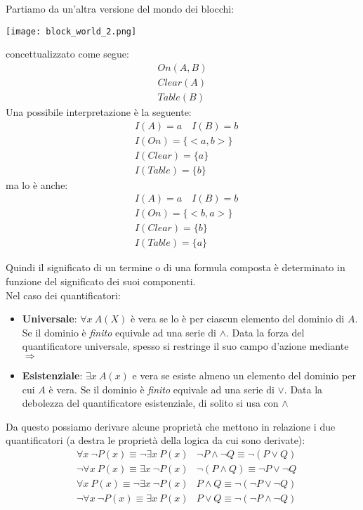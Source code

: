 \begin{example}
	Partiamo da un'altra versione del mondo dei blocchi:
	\begin{center}
		\texttt{[image: block\_world\_2.png]}
	\end{center}
	concettualizzato come segue:
	\begin{align*}
		On(A,B) \\
		Clear(A) \\
		Table(B)
	\end{align*}
	Una possibile interpretazione è la seguente:
	\begin{align*}
		&I(A)=a \quad I(B)=b \\
		&I(On)=\{<a,b>\}\\
		&I(Clear)=\{a\}\\
		&I(Table)=\{b\}
	\end{align*}
	ma lo è anche:
	\begin{align*}
		&I(A)=a \quad I(B)=b \\
		&I(On)=\{<b,a>\}\\
		&I(Clear)=\{b\}\\
		&I(Table)=\{a\}
	\end{align*}
\end{example}
Quindi il significato di un termine o di una formula composta è determinato in funzione del significato dei suoi componenti.\\
Nel caso dei quantificatori:
\begin{itemize}
	\item \textbf{Universale}: $\forall x \: A(X)$ è vera se lo è per ciascun elemento del dominio di $A$. Se il dominio è \textit{finito} equivale ad una serie di $\land$. Data la forza del quantificatore universale, spesso si restringe il suo campo d'azione mediante $\Rightarrow$
	\item \textbf{Esistenziale}: $\exists x \: A(x)$ e vera se esiste almeno un elemento del dominio per cui $A$ è vera. Se il dominio è \textit{finito} equivale ad una serie di $\lor$. Data la debolezza del quantificatore esistenziale, di solito si usa con $\land$
\end{itemize}
Da questo possiamo derivare alcune proprietà che mettono in relazione i due quantificatori (a destra le proprietà della logica da cui sono derivate):
\begin{align*}
	&\forall x \: \neg P(x) \equiv \neg \exists x \: P(x) & \neg P \land \neg Q \equiv \neg (P \lor Q)\\
	&\neg \forall x \: P(x) \equiv \exists x \: \neg P(x)&\neg(P \land Q) \equiv \neg P \lor \neg Q \\
	&\forall x \: P(x) \equiv \neg \exists x \: \neg P(x) & P \land Q \equiv \neg(\neg P \lor \neg Q)\\
	&\neg \forall x \: \neg P(x) \equiv \exists x \: P(x) & P \lor Q \equiv \neg (\neg P \land \neg Q)
\end{align*}

